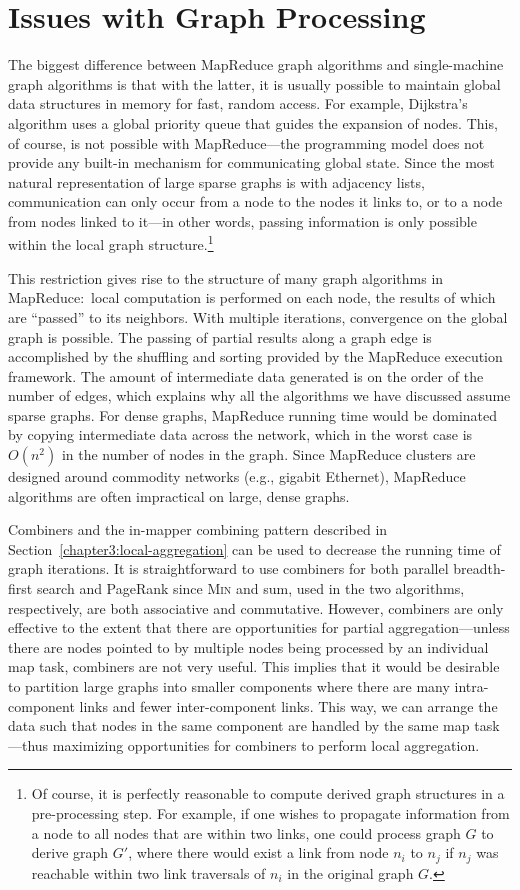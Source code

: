 \section{Issues with Graph Processing}
\label{chapter-graphs:issues}

The biggest difference between MapReduce graph algorithms and
single-machine graph algorithms is that with the latter, it is usually
possible to maintain global data structures in memory for fast, random
access.  For example, Dijkstra's algorithm uses a global priority
queue that guides the expansion of nodes.  This, of course, is not
possible with MapReduce---the programming model does not provide any
built-in mechanism for communicating global state.  Since the most
natural representation of large sparse graphs is with adjacency lists,
communication can only occur from a node to the nodes it links to, or
to a node from nodes linked to it---in other words, passing
information is only possible within the local graph
structure.\footnote{Of course, it is perfectly reasonable to compute
  derived graph structures in a pre-processing step.  For example, if
  one wishes to propagate information from a node to all nodes that
  are within two links, one could process graph $G$ to derive graph
  $G'$, where there would exist a link from node $n_i$ to $n_j$ if
  $n_j$ was reachable within two link traversals of $n_i$ in the
  original graph $G$.}

This restriction gives rise to the structure of many graph algorithms
in MapReduce:\ local computation is performed on each node, the
results of which are ``passed'' to its neighbors.  With multiple
iterations, convergence on the global graph is possible.  The passing
of partial results along a graph edge is accomplished by the shuffling
and sorting provided by the MapReduce execution framework.  The amount
of intermediate data generated is on the order of the number of edges,
which explains why all the algorithms we have discussed assume sparse
graphs.  For dense graphs, MapReduce running time would be dominated
by copying intermediate data across the network, which in the worst
case is $O(n^2)$ in the number of nodes in the graph.  Since MapReduce
clusters are designed around commodity networks (e.g., gigabit
Ethernet), MapReduce algorithms are often impractical on large, dense
graphs.

Combiners and the in-mapper combining pattern described in
Section~\ref{chapter3:local-aggregation} can be used to decrease the
running time of graph iterations.  It is straightforward to use
combiners for both parallel breadth-first search and PageRank since
\textsc{Min} and sum, used in the two algorithms, respectively, are
both associative and commutative.  However, combiners are only
effective to the extent that there are opportunities for partial
aggregation---unless there are nodes pointed to by multiple nodes
being processed by an individual map task, combiners are not very
useful.  This implies that it would be desirable to partition large
graphs into smaller components where there are many intra-component
links and fewer inter-component links.  This way, we can arrange the
data such that nodes in the same component are handled by the same map
task---thus maximizing opportunities for combiners to perform local
aggregation.

